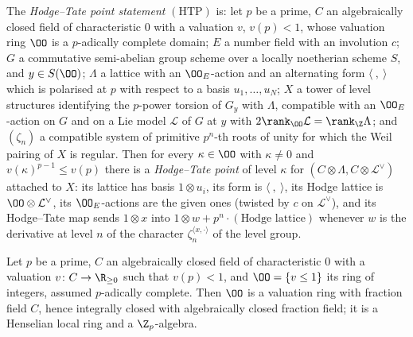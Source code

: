\begin{definition}\label{def:pf:deepstr:pointht}
The \emph{Hodge--Tate point statement} $\mathrm{(HTP)}$ is: let $p$ be a prime, $C$ an algebraically closed field of characteristic $0$
with a valuation $v$, $v(p)<1$, whose valuation ring $\OO$ is a $p$-adically complete domain; $E$ a number field with
an involution $c$; $G$ a commutative semi-abelian group scheme over a locally noetherian scheme $S$, and
$y\in S(\OO)$; $\Lambda$ a lattice with an $\OO_E$-action and an alternating form $\langle\ ,\ \rangle$ which is polarised at $p$ with
respect to a basis $u_1,\dots,u_N$; $X$ a tower of level structures identifying the $p$-power torsion of $G_y$ with
$\Lambda$, compatible with an $\OO_E$-action on $G$ and on a Lie model $\mathcal L$ of $G$ at $y$ with
$2\rank_{\OO}\mathcal L=\rank_\Z\Lambda$; and $(\zeta_n)$ a compatible system of primitive $p^n$-th roots of unity for which the
Weil pairing of $X$ is regular. Then for every $\kappa\in\OO$ with $\kappa\ne0$ and $v(\kappa)^{p-1}\le v(p)$ there is a
\emph{Hodge--Tate point} of level $\kappa$ for $(C\otimes\Lambda,C\otimes\mathcal L^\vee)$ attached to $X$: its lattice has basis
$1\otimes u_i$, its form is $\langle\ ,\ \rangle$, its Hodge lattice is $\OO\otimes\mathcal L^\vee$, its $\OO_E$-actions are the given ones
(twisted by $c$ on $\mathcal L^\vee$), and its Hodge--Tate map sends $1\otimes x$ into $1\otimes w+p^n\cdot(\text{Hodge lattice})$ whenever
$w$ is the derivative at level $n$ of the character $\zeta_n^{\langle x,\cdot\rangle}$ of the level group.
\end{definition}

\begin{lemma}\label{lem:pf:deepstr:integers}
Let $p$ be a prime, $C$ an algebraically closed field of characteristic $0$ with a valuation $v\colon C\to\R_{\ge0}$
such that $v(p)<1$, and $\OO=\{v\le1\}$ its ring of integers, assumed $p$-adically complete. Then $\OO$ is a valuation
ring with fraction field $C$, hence integrally closed with algebraically closed fraction field; it is a Henselian
local ring and a $\Z_p$-algebra.
\end{lemma}

